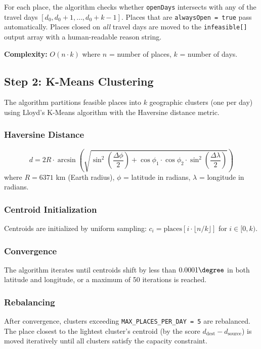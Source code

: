 \documentclass[12pt,a4paper]{report}
\begin{document}
For each place, the algorithm checks whether \texttt{openDays} intersects with any of the travel days $[d_0, d_0+1, \ldots, d_0+k-1]$. Places that are \texttt{alwaysOpen = true} pass automatically. Places closed on \emph{all} travel days are moved to the \texttt{infeasible[]} output array with a human-readable reason string.

\textbf{Complexity:} $O(n \cdot k)$ where $n$ = number of places, $k$ = number of days.

\subsection{Step 2: K-Means Clustering}

The algorithm partitions feasible places into $k$ geographic clusters (one per day) using Lloyd's K-Means algorithm with the Haversine distance metric.

\subsubsection{Haversine Distance}
\begin{equation}
d = 2R \cdot \arcsin\left(\sqrt{\sin^2\!\left(\frac{\Delta\phi}{2}\right) + \cos\phi_1 \cdot \cos\phi_2 \cdot \sin^2\!\left(\frac{\Delta\lambda}{2}\right)}\right)
\end{equation}
where $R = 6371$ km (Earth radius), $\phi$ = latitude in radians, $\lambda$ = longitude in radians.

\subsubsection{Centroid Initialization}
Centroids are initialized by uniform sampling: $c_i = \text{places}[i \cdot \lfloor n/k \rfloor]$ for $i \in [0, k)$.

\subsubsection{Convergence}
The algorithm iterates until centroids shift by less than $0.0001\degree$ in both latitude and longitude, or a maximum of 50 iterations is reached.

\subsubsection{Rebalancing}
After convergence, clusters exceeding \texttt{MAX\_PLACES\_PER\_DAY = 5} are rebalanced. The place closest to the lightest cluster's centroid (by the score $d_{\text{dest}} - d_{\text{source}}$) is moved iteratively until all clusters satisfy the capacity constraint.
\end{document}
